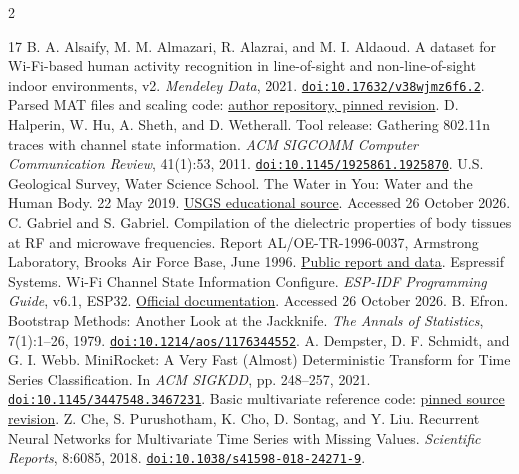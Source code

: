 \documentclass[a4paper,11pt,fleqn]{mira-author}
\begin{document}
\begin{multicols}{2}
\begin{thebibliography}{17}
B. A. Alsaify, M. M. Almazari, R. Alazrai, and M. I. Aldaoud. A dataset for Wi-Fi-based human activity recognition in line-of-sight and non-line-of-sight indoor environments, v2. \textit{Mendeley Data}, 2021. \href{https://doi.org/10.17632/v38wjmz6f6.2}{\nolinkurl{doi:10.17632/v38wjmz6f6.2}}. Parsed MAT files and scaling code: \href{https://github.com/lcsig/Dataset-for-Wi-Fi-based-human-activity-recognition-in-LOS-and-NLOS-indoor-environments/tree/5337147c5156948b13e6b05a50b79529614acfbe}{author repository, pinned revision}.
D. Halperin, W. Hu, A. Sheth, and D. Wetherall. Tool release: Gathering 802.11n traces with channel state information. \textit{ACM SIGCOMM Computer Communication Review}, 41(1):53, 2011. \href{https://doi.org/10.1145/1925861.1925870}{\nolinkurl{doi:10.1145/1925861.1925870}}.
U.S. Geological Survey, Water Science School. The Water in You: Water and the Human Body. 22 May 2019. \href{https://www.usgs.gov/water-science-school/science/water-you-water-and-human-body}{USGS educational source}. Accessed 26 October 2026.
C. Gabriel and S. Gabriel. Compilation of the dielectric properties of body tissues at RF and microwave frequencies. Report AL/OE-TR-1996-0037, Armstrong Laboratory, Brooks Air Force Base, June 1996. \href{https://niremf.ifac.cnr.it/docs/DIELECTRIC/home.html}{Public report and data}.
Espressif Systems. Wi-Fi Channel State Information Configure. \textit{ESP-IDF Programming Guide}, v6.1, ESP32. \href{https://docs.espressif.com/projects/esp-idf/en/v6.1/esp32/api-guides/wifi-driver/wifi-vendor-features.html}{Official documentation}. Accessed 26 October 2026.
B. Efron. Bootstrap Methods: Another Look at the Jackknife. \textit{The Annals of Statistics}, 7(1):1--26, 1979. \href{https://doi.org/10.1214/aos/1176344552}{\nolinkurl{doi:10.1214/aos/1176344552}}.
A. Dempster, D. F. Schmidt, and G. I. Webb. MiniRocket: A Very Fast (Almost) Deterministic Transform for Time Series Classification. In \textit{ACM SIGKDD}, pp. 248--257, 2021. \href{https://doi.org/10.1145/3447548.3467231}{\nolinkurl{doi:10.1145/3447548.3467231}}. Basic multivariate reference code: \href{https://github.com/angus924/minirocket/tree/0b1c245d9c9dbc50886f28bc7b32d5d45b5663d6}{pinned source revision}.
Z. Che, S. Purushotham, K. Cho, D. Sontag, and Y. Liu. Recurrent Neural Networks for Multivariate Time Series with Missing Values. \textit{Scientific Reports}, 8:6085, 2018. \href{https://doi.org/10.1038/s41598-018-24271-9}{\nolinkurl{doi:10.1038/s41598-018-24271-9}}.

\end{thebibliography}
\end{multicols}
\end{document}

